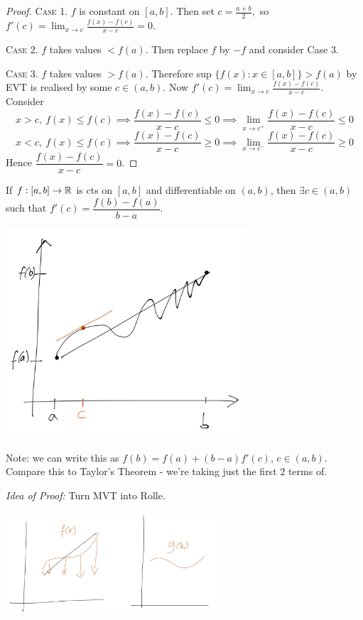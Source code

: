 \documentclass[10pt,twoside]{scrartcl}
\begin{document}
\begin{proof}

\textsc{Case 1.} $f$ is constant on $[a,b]$. Then set $c = \frac{a+b}{2},$ so $f'(c) = \lim_{x\to c}\frac{f(x) - f(c)}{x-c} = 0$.

\textsc{Case 2.} $f$ takes values $< f(a)$. Then replace $f$ by $-f$ and consider Case 3.

\textsc{Case 3.} $f$ takes values $> f(a)$. Therefore sup $\{f(x): x \in [a,b]\} > f(a)$ by EVT is realised by some $c \in (a,b)$. Now $f'(c) = \lim_{x\to c} \frac{f(x) - f(c)}{x-c}$. Consider
 \[x > c,~f(x) \leq f(c) \implies \frac{f(x) - f(c)}{x-c} \leq 0 \implies \lim_{x \to c^{+}} \frac{f(x) - f(c)}{x-c} \leq 0\]
 \[x < c,~f(x) \leq f(c) \implies \frac{f(x) - f(c)}{x-c} \geq 0 \implies \lim_{x \to c^{-}} \frac{f(x) - f(c)}{x-c} \geq 0 \] 
 Hence  $\dfrac{f(x) - f(c)}{x-c} = 0$.	
\end{proof}\vsp


\vspace*{5pt}


\begin{theorem}
If $f:[a,b] \to \mathbb{R}$ is cts on $[a,b]$ and differentiable on $(a,b)$, then $\exists c \in (a,b)$ such that $f'(c) = \dfrac{f(b) - f(a)}{b-a}$.
\end{theorem}


\begin{center}
\includegraphics[width = 9cm]{mvt1.jpg}
\end{center}
Note: we can write this as $f(b) = f(a) + (b-a)f'(c)$, $c \in (a,b)$. Compare this to Taylor's Theorem - we're taking just the first $2$ terms of.

\emph{Idea of Proof:} Turn MVT into Rolle. 

\begin{center}
\includegraphics[width = 8cm]{mvt2.jpg}
\end{center}
\end{document}

